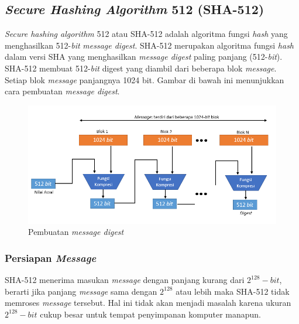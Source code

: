 \subsection{\textit{Secure Hashing Algorithm} 512 (SHA-512)}
\label{subsec:SHA512}
\textit{Secure hashing algorithm} 512 atau SHA-512 adalah algoritma fungsi \textit{hash} yang menghasilkan 512-\textit{bit} \textit{message digest}. SHA-512 merupakan algoritma fungsi \textit{hash} dalam versi SHA yang menghasilkan \textit{message digest} paling panjang (512-\textit{bit}). SHA-512 membuat 512-\textit{bit} digest yang diambil dari beberapa blok \textit{message}. Setiap blok \textit{message} panjangnya 1024 bit. Gambar di bawah ini menunjukkan cara pembuatan \textit{message digest}.

\begin{figure}[ht]
	\includegraphics[scale=0.8]{Gambar/digest_creation}
	\centering
	\caption{Pembuatan \textit{message digest}}
\end{figure}

\subsubsection{Persiapan \textit{Message}}
\label{sssec:persiapan_message}
SHA-512 menerima masukan \textit{message} dengan panjang kurang dari \begin{math}2^{128}-\textit{bit}\end{math}, berarti jika panjang \textit{message} sama dengan \begin{math}2^{128}\end{math} atau lebih maka SHA-512 tidak memroses \textit{message} tersebut. Hal ini tidak akan menjadi masalah karena ukuran \begin{math}2^{128}-\textit{bit}\end{math} cukup besar untuk tempat penyimpanan komputer manapun.

